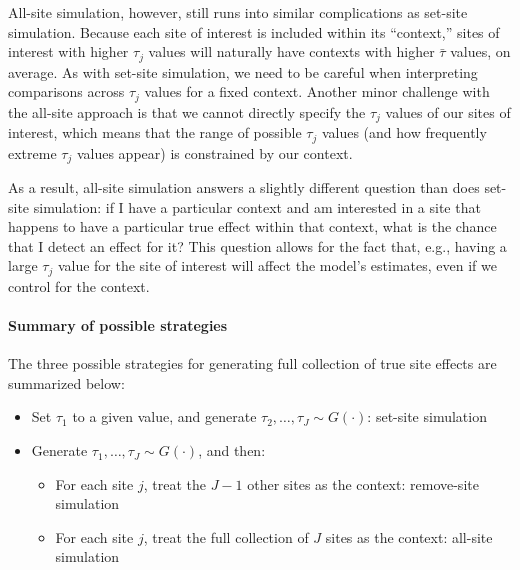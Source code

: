 \documentclass[]{article}
\begin{document}
All-site simulation, however, still runs into similar complications as set-site simulation.
Because each site of interest is included within its ``context,'' sites of interest with higher $\tau_j$ values will naturally have contexts with higher $\bar{\tau}$ values, on average.
As with set-site simulation, we need to be careful when interpreting comparisons across $\tau_j$ values for a fixed context.
Another minor challenge with the all-site approach is that we cannot directly specify the $\tau_j$ values of our sites of interest, which means that the range of possible $\tau_j$ values (and how frequently extreme $\tau_j$ values appear) is constrained by our context.

As a result, all-site simulation answers a slightly different question than does set-site simulation: if I have a particular context and am interested in a site that happens to have a particular true effect within that context, what is the chance that I detect an effect for it?
This question allows for the fact that, e.g., having a large $\tau_j$ value for the site of interest will affect the model's estimates, even if we control for the context.

\paragraph{Summary of possible strategies} The three possible strategies for generating full collection of true site effects are summarized below:
\begin{itemize}
	\item Set $\tau_1$ to a given value, and generate $\tau_2, \dots, \tau_J \sim G(\cdot)$: set-site simulation
	\item Generate $\tau_1, \dots, \tau_J \sim G(\cdot)$, and then:
	\begin{itemize}
		\item For each site $j$, treat the $J-1$ other sites as the context: remove-site simulation
		\item For each site $j$, treat the full collection of $J$ sites as the context: all-site simulation
	\end{itemize}
\end{itemize}
\end{document}
